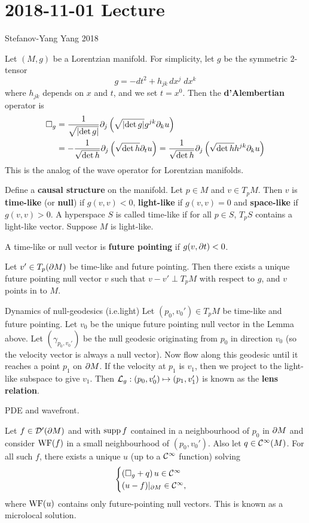 \section{2018-11-01 Lecture}

Stefanov-Yang Yang 2018

Let $(M,g)$ be a Lorentzian manifold.
For simplicity, let $g$ be the symmetric $2$-tensor
\[ g = -dt^2 + h_{jk} \, dx^j \; dx^k \]
where $h_{jk}$ depends on $x$ and $t$, and we set $t=x^0$.
Then the \textbf{d'Alembertian} operator is
\begin{align*}
  \square_g &= \frac{1}{\sqrt{\left\lvert \det g \right\rvert}} \partial_j\left( \sqrt{\left\lvert \det g \right\rvert} g^{jk} \partial_k u \right) \\
  &= -\frac{1}{\sqrt{\det h}} \partial_j\left( \sqrt{\det h} \partial_t u \right) = \frac{1}{\sqrt{\det h}} \partial_j\left( \sqrt{\det h} h^{jk} \partial_k u \right) \\
\end{align*}
This is the analog of the wave operator for Lorentzian manifolds.

Define a \textbf{causal structure} on the manifold.
Let $p\in M$ and $v\in T_pM$.
Then $v$ is \textbf{time-like} (or \textbf{null}) if $g(v,v)<0$, \textbf{light-like} if $g(v,v)=0$ and \textbf{space-like} if $g(v,v)>0$.
A hyperspace $S$ is called time-like if for all $p\in S$, $T_pS$ contains a light-like vector.
Suppose $M$ is light-like.

A time-like or null vector is \textbf{future pointing} if $g(v,\partial t)<0$.

\begin{lem}
  Let $v'\in T_p(\partial M)$ be time-like and future pointing.
  Then there exists a unique future pointing null vector $v$ such that $v-v'\perp T_pM$ with respect to $g$, and $v$ points in to $M$.
\end{lem}

Dynamics of null-geodesics (i.e.\@ light)
Let $(p_0,v_0')\in T_pM$ be time-like and future pointing.
Let $v_0$ be the unique future pointing null vector in the Lemma above.
Let $(\gamma_{p_0,v_0'})$ be the null geodesic originating from $p_0$ in direction $v_0$ (so the velocity vector is always a null vector).
Now flow along this geodesic until it reaches a point $p_1$ on $\partial M$.
If the velocity at $p_1$ is $v_1$, then we project to the light-like subspace to give $v_1$.
Then $\mathcal{L}_g:(p_0,v_0') \mapsto (p_1,v_1')$ is known as the \textbf{lens relation}.

PDE and wavefront.

Let $f\in\mathcal{D}'(\partial M)$ and with $\operatorname{supp} f$ contained in a neighbourhood of $p_0$ in $\partial M$ and consider $\operatorname{WF}(f)$ in a small neighbourhood of $(p_0,v_0')$.
Also let $q\in\mathcal{C}^\infty(M)$.
For all such $f$, there exists a unique $u$ (up to a $\mathcal{C}^\infty$ function) solving
\begin{equation*}
  \begin{cases}
    \left( \square_g+q \right)u \in \mathcal{C}^\infty \\
    (u-f)|_{\partial M} \in \mathcal{C}^\infty,
  \end{cases}
\end{equation*}
where $\operatorname{WF}(u)$ contains only future-pointing null vectors.
This is known as a microlocal solution.


